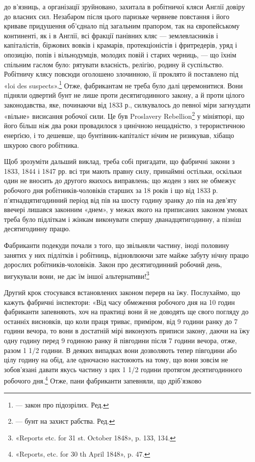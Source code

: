 \parcont{}  %
до в’язниць, а організації зруйновано, захитала в робітничої
кляси Англії довіру до власних сил. Незабаром після цього паризьке
червневе повстання і його криваве придушення об’єднало
під загальним прапором, так на європейському континенті, як
і в Англії, всі фракції панівних кляс — землевласників і капіталістів,
біржових вовків і крамарів, протекціоністів і фритредерів,
уряд і опозицію, попів і вільнодумців, молодих повій і
старих черниць, — що їхнім спільним гаслом було: рятувати власність,
релігію, родину й суспільство. Робітничу клясу повсюди
оголошено злочинною, її проклято й поставлено під «loi des
suspects».\footnote*{
— закон про підозрілих. Ред.
} Отже, фабрикантам не треба було далі церемонитися.
Вони підняли одвертий бунт не лише проти десятигодинного закону,
а й проти цілого законодавства, яке, починаючи від 1833 р., силкувалось
до певної міри загнуздати «вільне» висисання робочої
сили. Це був Proslavery Rebellion\footnote*{
— бунт на захист рабства. Ред.
} у мініятюрі, що його більш
ніж два роки провадилося з цинічною нещадністю, з терористичною
енерґією, і то дешевше, що бунтівник-капіталіст нічим
не ризикував, хібащо шкурою свого робітника.

Щоб зрозуміти дальший виклад, треба собі пригадати, що
фабричні закони з 1833, 1844 і 1847 рр. всі три мають правну
силу, принаймні остільки, оскільки один не вносить до другого
якихось виправлень; що жоден з них не обмежує робочого дня
робітників-чоловіків старших за 18 років і що від 1833 р. п’ятнадцятигодинний
період від пів на шосту годину зранку до пів
на дев’яту ввечері лишався законним «днем», у межах якого
на приписаних законом умовах треба було підліткам і жінкам
виконувати спершу дванадцятигодинну, а пізніш десятигодинну
працю.

Фабриканти подекуди почали з того, що звільняли частину,
іноді половину занятих у них підлітків і робітниць, відновлюючи
зате майже забуту нічну працю дорослих робітників-чоловіків.
Закон про десятигодинний робочий день, вигукували вони, не
дає їм іншої альтернативи!\footnote{
«Reports etc. for 31 st. October 1848», p. 133, 134.
}

Другий крок стосувався встановлених законом перерв на їжу.
Послухаймо, що кажуть фабричні інспектори: «Від часу обмеження
робочого дня на 10 годин фабриканти запевняють, хоч на практиці
вони й не доводять ще свого погляду до останніх висновків,
що коли праця триває, приміром, від 9 години ранку до 7 години
вечора, то вони в достатній мірі виконують приписи закону, даючи
на їжу одну годину перед 9 годиною ранку й півгодини після
7 години вечора, отже, разом 1 1/2 години. В деяких випадках
вони дозволяють тепер півгодини або цілу годину на обід, але одночасно
настоюють на тому, що вони зовсім не зобов’язані давати
якусь частину з цих 1 1/2 години протягом десятигодинного робочого
дня.\footnote{
«Reports, etc. for 30 th April 1848», p. 47.
} Отже, пани фабриканти запевняли, що дріб’язково
\parbreak{}  %
